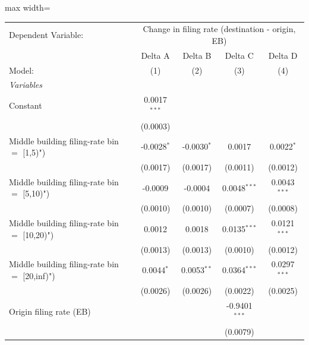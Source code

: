 \documentclass[
  11pt,
]{article}
\begin{document}
\begin{adjustbox}{max width=\textwidth}
\begingroup
\centering
\begin{tabular}{lcccc}
   \tabularnewline \midrule \midrule
   Dependent Variable: & \multicolumn{4}{c}{Change in filing rate (destination - origin, EB)}\\
                                                  & Delta A        & Delta B       & Delta C         & Delta D \\   
   Model:                                         & (1)            & (2)           & (3)             & (4)\\  
   \midrule
   \emph{Variables}\\
   Constant                                       & 0.0017$^{***}$ &               &                 &   \\   
                                                  & (0.0003)       &               &                 &   \\   
   Middle building filing-rate bin $=$ [1,5)")    & -0.0028$^{*}$  & -0.0030$^{*}$ & 0.0017          & 0.0022$^{*}$\\   
                                                  & (0.0017)       & (0.0017)      & (0.0011)        & (0.0012)\\   
   Middle building filing-rate bin $=$ [5,10)")   & -0.0009        & -0.0004       & 0.0048$^{***}$  & 0.0043$^{***}$\\   
                                                  & (0.0010)       & (0.0010)      & (0.0007)        & (0.0008)\\   
   Middle building filing-rate bin $=$ [10,20)")  & 0.0012         & 0.0018        & 0.0135$^{***}$  & 0.0121$^{***}$\\   
                                                  & (0.0013)       & (0.0013)      & (0.0010)        & (0.0012)\\   
   Middle building filing-rate bin $=$ [20,inf)") & 0.0044$^{*}$   & 0.0053$^{**}$ & 0.0364$^{***}$  & 0.0297$^{***}$\\   
                                                  & (0.0026)       & (0.0026)      & (0.0022)        & (0.0025)\\   
   Origin filing rate (EB)                        &                &               & -0.9401$^{***}$ &   \\   
                                                  &                &               & (0.0079)        &   \\   

\end{tabular}
\end{adjustbox}
\end{document}
